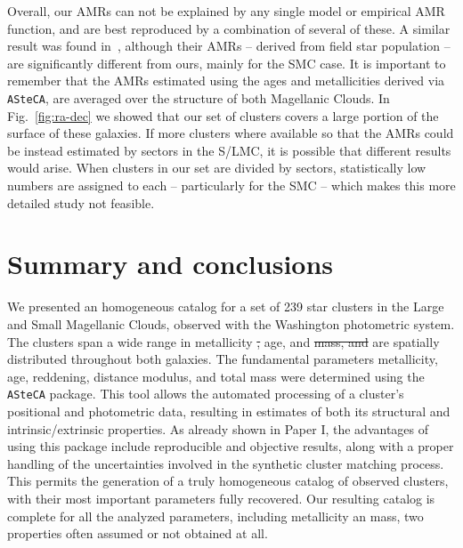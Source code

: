 \documentclass[draft]{aa}
\providecommand{\DIFaddtex}[1]{{\protect\color{blue}\uwave{#1}}} %
\providecommand{\DIFdeltex}[1]{{\protect\color{red}\sout{#1}}}                      %
\providecommand{\DIFaddbegin}{} %
\providecommand{\DIFaddend}{} %
\providecommand{\DIFdelbegin}{} %
\providecommand{\DIFdelend}{} %
\providecommand{\DIFadd}[1]{\texorpdfstring{\DIFaddtex{#1}}{#1}} %
\providecommand{\DIFdel}[1]{\texorpdfstring{\DIFdeltex{#1}}{}} %
\begin{document}
Overall, our AMRs can not be explained by any single model or empirical AMR
function, and are best reproduced by a combination of several of these. A
similar result was found in~\cite{Piatti_Geisler_2013}, although their AMRs --
derived from field star population -- are significantly different from ours,
mainly for the SMC case.
%
It is important to remember that the AMRs estimated using the ages and
metallicities derived via \texttt{ASteCA}, are averaged over the structure of
both Magellanic Clouds. In Fig.~\ref{fig:ra-dec} we showed that our set of
clusters covers a large portion of the surface of these galaxies.
%
If more clusters where available so that the AMRs could be instead estimated by
sectors in the S/LMC, it is possible that different results would arise. When
clusters in our set are divided by sectors, statistically low numbers are
assigned to each -- particularly for the SMC -- which makes this more detailed
study not feasible.





\section{Summary and conclusions}
\label{sec:summ-concl}

We presented an homogeneous catalog for a set of 239 star clusters in the
Large and Small Magellanic Clouds, observed with the Washington photometric
system. The clusters span a wide range in metallicity \DIFdelbegin \DIFdel{, }\DIFdelend \DIFaddbegin \DIFadd{and }\DIFaddend age, and \DIFdelbegin \DIFdel{mass, and }\DIFdelend are
spatially distributed throughout both galaxies.
%
The fundamental parameters metallicity, age, reddening, distance modulus, and
total mass were determined using the \texttt{ASteCA} package.
%
This tool allows the automated processing of a cluster's positional and
photometric data, resulting in estimates of both its structural and
intrinsic/extrinsic properties.
%
As already shown in Paper I, the advantages of using this package include
reproducible and objective results, along with a proper handling of the
uncertainties involved in the synthetic cluster matching process.
%
This permits the generation of a truly homogeneous catalog of observed
clusters, with their most important parameters fully recovered.
%
Our resulting catalog is complete for all the analyzed parameters, including
metallicity an mass, two properties often assumed or not obtained at all.
\end{document}
